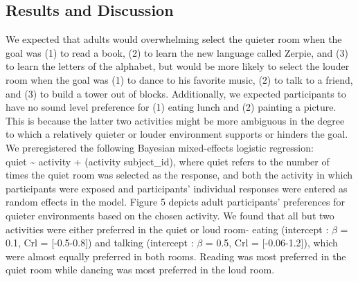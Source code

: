 \documentclass[10pt, letterpaper]{article}
\begin{document}
\hypertarget{results-and-discussion-2}{%
\subsection{\texorpdfstring{\textbf{Results and
Discussion}}{Results and Discussion}}\label{results-and-discussion-2}}

We expected that adults would overwhelming select the quieter room when
the goal was (1) to read a book, (2) to learn the new language called
Zerpie, and (3) to learn the letters of the alphabet, but would be more
likely to select the louder room when the goal was (1) to dance to his
favorite music, (2) to talk to a friend, and (3) to build a tower out of
blocks. Additionally, we expected participants to have no sound level
preference for (1) eating lunch and (2) painting a picture. This is
because the latter two activities might be more ambiguous in the degree
to which a relatively quieter or louder environment supports or hinders
the goal. We preregistered the following Bayesian mixed-effects logistic
regression:\\
quiet \textasciitilde{} activity + (activity \textbar{} subject\_id),
where quiet refers to the number of times the quiet room was selected as
the response, and both the activity in which participants were exposed
and participants' individual responses were entered as random effects in
the model. Figure 5 depicts adult participants' preferences for quieter
environments based on the chosen activity. We found that all but two
activities were either preferred in the quiet or loud room- eating
(intercept : \(\beta\) = 0.1, Crl = {[}-0.5-0.8{]}) and talking
(intercept : \(\beta\) = 0.5, Crl = {[}-0.06-1.2{]}), which were almost
equally preferred in both rooms. Reading was most preferred in the quiet
room while dancing was most preferred in the loud room.
\end{document}

